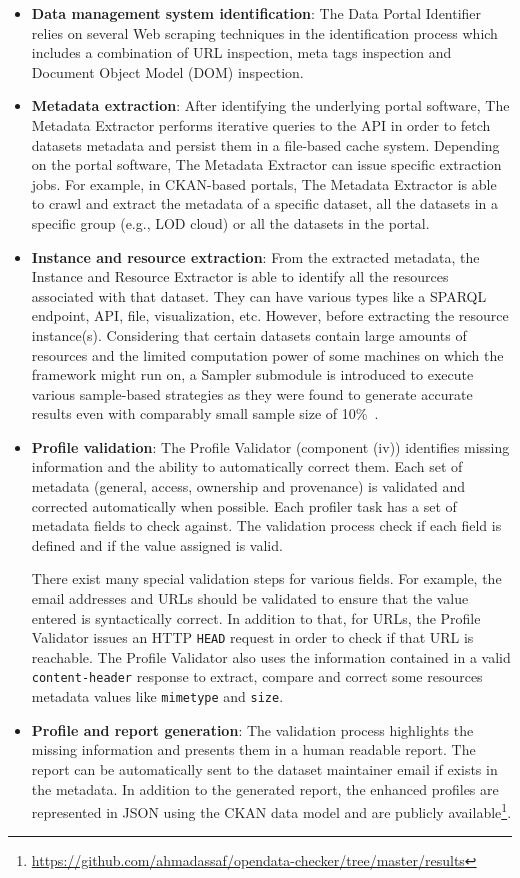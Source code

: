 \documentclass[a4paper,11pt,twoside]{ThesisStyle}
\begin{document}
\begin{itemize}
	\item \textbf{Data management system identification}: The Data Portal Identifier relies on several Web scraping techniques in the identification process which includes a combination of URL inspection, meta tags inspection and Document Object Model (DOM) inspection.
	\item \textbf{Metadata extraction}: After identifying the underlying portal software, The Metadata Extractor performs iterative queries to the API in order to fetch datasets metadata and persist them in a file-based cache system. Depending on the portal software, The Metadata Extractor can issue specific extraction jobs. For example, in CKAN-based portals, The Metadata Extractor is able to crawl and extract the metadata of a specific dataset, all the datasets in a specific group (e.g., LOD cloud) or all the datasets in the portal.
	\item \textbf{Instance and resource extraction}: From the extracted metadata, the Instance and Resource Extractor is able to identify all the resources associated with that dataset. They can have various types like a SPARQL endpoint, API, file, visualization, etc. However, before extracting the resource instance(s). Considering that certain datasets contain large amounts of resources and the limited computation power of some machines on which the framework might run on, a Sampler submodule is introduced to execute various sample-based strategies as they were found to generate accurate results even with comparably small sample size of 10\%~\cite{Fetahu:ESWC:14}.
	\item \textbf{Profile validation}: The Profile Validator (component (iv)) identifies missing information and the ability to automatically correct them. Each set of metadata (general, access, ownership and provenance) is validated and corrected automatically when possible. Each profiler task has a set of metadata fields to check against. The validation process check if each field is defined and if the value assigned is valid.

	There exist many special validation steps for various fields. For example, the email addresses and URLs should be validated to ensure that the value entered is syntactically correct. In addition to that, for URLs, the Profile Validator issues an HTTP \texttt{HEAD} request in order to check if that URL is reachable. The Profile Validator also uses the information contained in a valid \texttt{content-header} response to extract, compare and correct some resources metadata values like \texttt{mimetype} and \texttt{size}.
	\item \textbf{Profile and report generation}: The validation process highlights the missing information and presents them in a human readable report. The report can be automatically sent to the dataset maintainer email if exists in the metadata. In addition to the generated report, the enhanced profiles are represented in JSON using the CKAN data model and are publicly available\footnote{\url{https://github.com/ahmadassaf/opendata-checker/tree/master/results}}.
\end{itemize}
\end{document}
